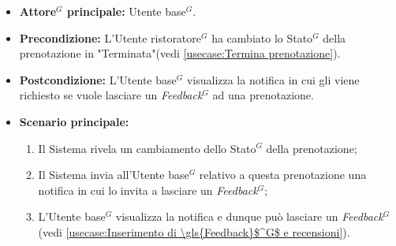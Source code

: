 \label{usecase:Visualizzazione della notifica di richiesta di inserimento \gls{Feedback}$^G$}
\begin{itemize}
	\item \textbf{\gls{Attore}$^G$ principale:} \gls{Utente base}$^G$.


	\item \textbf{Precondizione:} L'\gls{Utente ristoratore}$^G$ ha cambiato lo \gls{Stato}$^G$ della prenotazione in "Terminata"(vedi \autoref{usecase:Termina prenotazione}).


	\item \textbf{Postcondizione:} L'\gls{Utente base}$^G$ visualizza la notifica in cui
	      gli viene richiesto se vuole lasciare un \textit{\gls{Feedback}$^G$} ad una prenotazione.

	\item \textbf{Scenario principale:}
	      \begin{enumerate}
		      \item Il Sistema rivela un cambiamento dello \gls{Stato}$^G$ della prenotazione;
		      \item Il Sistema invia all'\gls{Utente base}$^G$ relativo a questa prenotazione una notifica in cui lo invita a lasciare un \textit{\gls{Feedback}$^G$};
		      \item L'\gls{Utente base}$^G$ visualizza la notifica e dunque può lasciare un \textit{\gls{Feedback}$^G$} (vedi \autoref{usecase:Inserimento di \gls{Feedback}$^G$ e recensioni}).
	      \end{enumerate}
\end{itemize}
